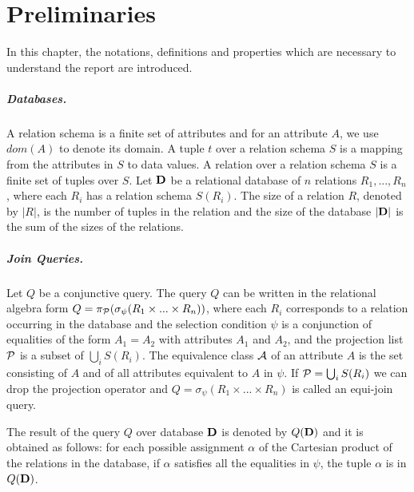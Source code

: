 \chapter{Preliminaries}



In this chapter, the notations, definitions and properties which are necessary to understand the report are introduced. 

\paragraph{Databases.} A relation schema is a finite set of attributes and for an attribute $A$, we use $dom(A)$ to denote its domain. A tuple $t$ over a relation schema $S$ is a mapping from the attributes in $S$ to data values. A relation over a relation schema $S$ is a finite set of tuples over $S$. Let $\mathbf{D}$ be a relational database of $n$ relations $R_1, ..., R_n$, where each $R_i$ has a relation schema $S(R_i)$. The size of a relation $R$, denoted by $|R|$, is the number of tuples in the relation and the size of the database $|\mathbf{D}|$ is the sum of the sizes of the relations. 


\paragraph{Join Queries.}
Let $Q$ be a conjunctive query. The query $Q$ can be written in the relational algebra form $Q = \pi_{\mathcal{P}}(\sigma_{\psi}(R_1 \times ... \times R_n))$, where each $R_i$ corresponds to a relation occurring in the database and the selection condition $\psi$ is a conjunction of equalities of the form $A_1 = A_2$ with attributes $A_1$ and $A_2$, and the projection list $\mathcal{P}$ is a subset of $\bigcup_i S(R_i)$. The equivalence class $\mathcal{A}$ of an attribute $A$ is the set consisting of $A$ and of all attributes equivalent to $A$ in $\psi$. If $\mathcal{P} = \bigcup_i S(R_i)$ we can drop the projection operator and $Q = \sigma_{\psi}(R_1 \times ... \times R_n)$ is called an equi-join query. 

The result of the query $Q$ over database $\mathbf{D}$ is denoted by $Q(\mathbf{D})$ and it is obtained as follows: for each possible assignment $\alpha$ of the Cartesian product of the relations in the database, if $\alpha$ satisfies all the equalities in $\psi$, the tuple $\alpha$ is in $Q(\mathbf{D})$.


